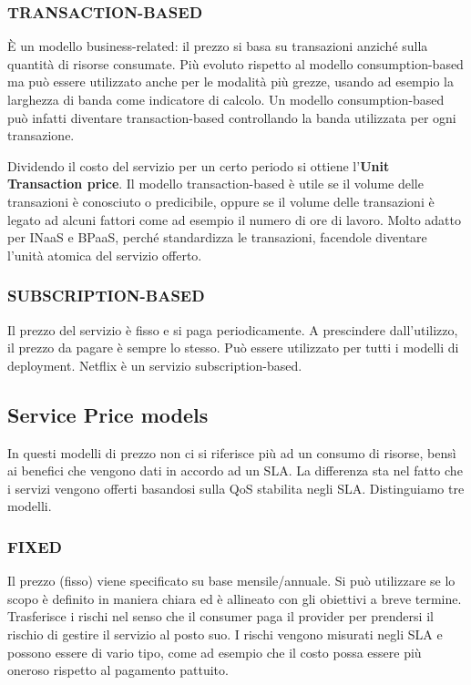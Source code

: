 \subsubsection{\textbf{TRANSACTION-BASED}}
È un modello business-related: il prezzo si basa su transazioni anziché sulla quantità di risorse consumate. Più evoluto rispetto al modello consumption-based ma può essere utilizzato anche per le modalità più grezze, usando ad esempio la larghezza di banda come indicatore di calcolo. Un modello consumption-based può infatti diventare transaction-based controllando la banda utilizzata per ogni transazione.

Dividendo il costo del servizio per un certo periodo si ottiene l'\textbf{Unit Transaction price}. Il modello transaction-based è utile se il volume delle transazioni è conosciuto o predicibile, oppure se il volume delle transazioni è legato ad alcuni fattori come ad esempio il numero di ore di lavoro. Molto adatto per INaaS e BPaaS, perché standardizza le transazioni, facendole diventare l'unità atomica del servizio offerto.

\subsubsection{\textbf{SUBSCRIPTION-BASED}}
Il prezzo del servizio è fisso e si paga periodicamente. A prescindere dall'utilizzo, il prezzo da pagare è sempre lo stesso. Può essere utilizzato per tutti i modelli di deployment. Netflix è un servizio subscription-based.

\subsection{Service Price models}
In questi modelli di prezzo non ci si riferisce più ad un consumo di risorse, bensì ai benefici che vengono dati in accordo ad un SLA. La differenza sta nel fatto che i servizi vengono offerti basandosi sulla QoS stabilita negli SLA. Distinguiamo tre modelli.

\subsubsection{FIXED}
Il prezzo (fisso) viene specificato su base mensile/annuale. Si può utilizzare se lo scopo è definito in maniera chiara ed è allineato con gli obiettivi a breve termine. Trasferisce i rischi nel senso che il consumer paga il provider per prendersi il rischio di gestire il servizio al posto suo. I rischi vengono misurati negli SLA e possono essere di vario tipo, come ad esempio che il costo possa essere più oneroso rispetto al pagamento pattuito.

